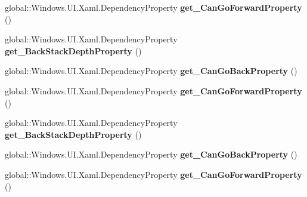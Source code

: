 \begin{DoxyCompactItemize}
global\+::\+Windows.\+U\+I.\+Xaml.\+Dependency\+Property {\bfseries get\+\_\+\+Can\+Go\+Forward\+Property} ()
\item 
\mbox{\label{interface_windows_1_1_u_i_1_1_xaml_1_1_controls_1_1_i_frame_statics_ab70bb623eafe2acb9e5726f24c2a7b97}} 
global\+::\+Windows.\+U\+I.\+Xaml.\+Dependency\+Property {\bfseries get\+\_\+\+Back\+Stack\+Depth\+Property} ()
\item 
\mbox{\label{interface_windows_1_1_u_i_1_1_xaml_1_1_controls_1_1_i_frame_statics_ab9ef06194fcc3f0ac0fe148b9708b5a2}} 
global\+::\+Windows.\+U\+I.\+Xaml.\+Dependency\+Property {\bfseries get\+\_\+\+Can\+Go\+Back\+Property} ()
\item 
\mbox{\label{interface_windows_1_1_u_i_1_1_xaml_1_1_controls_1_1_i_frame_statics_a702820de0c4191e80538e6ccaa2807a4}} 
global\+::\+Windows.\+U\+I.\+Xaml.\+Dependency\+Property {\bfseries get\+\_\+\+Can\+Go\+Forward\+Property} ()
\item 
\mbox{\label{interface_windows_1_1_u_i_1_1_xaml_1_1_controls_1_1_i_frame_statics_ab70bb623eafe2acb9e5726f24c2a7b97}} 
global\+::\+Windows.\+U\+I.\+Xaml.\+Dependency\+Property {\bfseries get\+\_\+\+Back\+Stack\+Depth\+Property} ()
\item 
\mbox{\label{interface_windows_1_1_u_i_1_1_xaml_1_1_controls_1_1_i_frame_statics_ab9ef06194fcc3f0ac0fe148b9708b5a2}} 
global\+::\+Windows.\+U\+I.\+Xaml.\+Dependency\+Property {\bfseries get\+\_\+\+Can\+Go\+Back\+Property} ()
\item 
\mbox{\label{interface_windows_1_1_u_i_1_1_xaml_1_1_controls_1_1_i_frame_statics_a702820de0c4191e80538e6ccaa2807a4}} 
global\+::\+Windows.\+U\+I.\+Xaml.\+Dependency\+Property {\bfseries get\+\_\+\+Can\+Go\+Forward\+Property} ()
\item 
\mbox{\label{interface_windows_1_1_u_i_1_1_xaml_1_1_controls_1_1_i_frame_statics_ab70bb623eafe2acb9e5726f24c2a7b97}} 

\end{DoxyCompactItemize}
